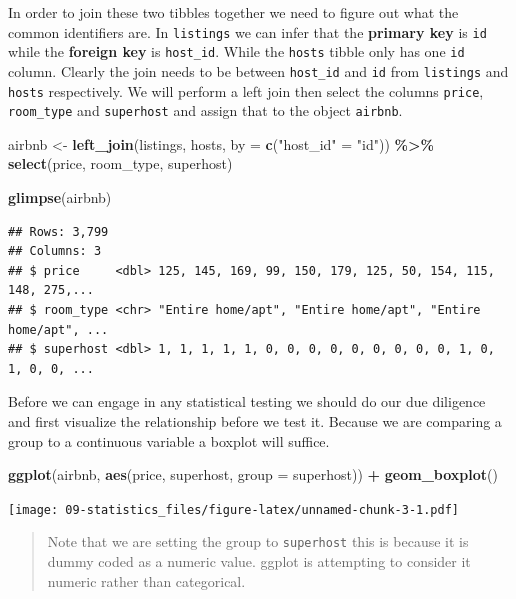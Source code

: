 \documentclass[
]{book}
\newenvironment{Shaded}{\begin{snugshade}}{\end{snugshade}}
\newcommand{\DataTypeTok}[1]{\textcolor[rgb]{0.13,0.29,0.53}{#1}}
\newcommand{\KeywordTok}[1]{\textcolor[rgb]{0.13,0.29,0.53}{\textbf{#1}}}
\newcommand{\NormalTok}[1]{#1}
\newcommand{\OperatorTok}[1]{\textcolor[rgb]{0.81,0.36,0.00}{\textbf{#1}}}
\newcommand{\StringTok}[1]{\textcolor[rgb]{0.31,0.60,0.02}{#1}}
\begin{document}
In order to join these two tibbles together we need to figure out what the common identifiers are. In \texttt{listings} we can infer that the \textbf{primary key} is \texttt{id} while the \textbf{foreign key} is \texttt{host\_id}. While the \texttt{hosts} tibble only has one \texttt{id} column. Clearly the join needs to be between \texttt{host\_id} and \texttt{id} from \texttt{listings} and \texttt{hosts} respectively. We will perform a left join then select the columns \texttt{price}, \texttt{room\_type} and \texttt{superhost} and assign that to the object \texttt{airbnb}.

\begin{Shaded}
\begin{Highlighting}[]
\NormalTok{airbnb \textless{}{-}}\StringTok{ }\KeywordTok{left\_join}\NormalTok{(listings, hosts, }\DataTypeTok{by =} \KeywordTok{c}\NormalTok{(}\StringTok{"host\_id"}\NormalTok{ =}\StringTok{ "id"}\NormalTok{)) }\OperatorTok{\%\textgreater{}\%}\StringTok{ }
\StringTok{  }\KeywordTok{select}\NormalTok{(price, room\_type, superhost) }

\KeywordTok{glimpse}\NormalTok{(airbnb)}
\end{Highlighting}
\end{Shaded}

\begin{verbatim}
## Rows: 3,799
## Columns: 3
## $ price     <dbl> 125, 145, 169, 99, 150, 179, 125, 50, 154, 115, 148, 275,...
## $ room_type <chr> "Entire home/apt", "Entire home/apt", "Entire home/apt", ...
## $ superhost <dbl> 1, 1, 1, 1, 1, 0, 0, 0, 0, 0, 0, 0, 0, 0, 1, 0, 1, 0, 0, ...
\end{verbatim}

Before we can engage in any statistical testing we should do our due diligence and first visualize the relationship before we test it. Because we are comparing a group to a continuous variable a boxplot will suffice.

\begin{Shaded}
\begin{Highlighting}[]
\KeywordTok{ggplot}\NormalTok{(airbnb, }\KeywordTok{aes}\NormalTok{(price, superhost, }\DataTypeTok{group =}\NormalTok{ superhost)) }\OperatorTok{+}
\StringTok{  }\KeywordTok{geom\_boxplot}\NormalTok{()}
\end{Highlighting}
\end{Shaded}

\texttt{[image: 09-statistics\_files/figure-latex/unnamed-chunk-3-1.pdf]}

\begin{quote}
Note that we are setting the group to \texttt{superhost} this is because it is dummy coded as a numeric value. ggplot is attempting to consider it numeric rather than categorical.
\end{quote}
\end{document}
